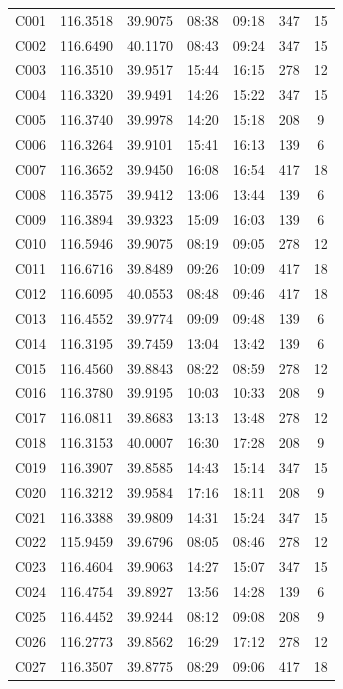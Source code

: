 \documentclass{setp-new}
\begin{document}
\begin{supertabular*}{\textwidth}{@{\extracolsep{\fill}}ccccccc@{}}
C001 & 116.3518 & 39.9075 & 08:38 & 09:18 & 347 & 15\\
C002 & 116.6490 & 40.1170 & 08:43 & 09:24 & 347 & 15\\
C003 & 116.3510 & 39.9517 & 15:44 & 16:15 & 278 & 12\\
C004 & 116.3320 & 39.9491 & 14:26 & 15:22 & 347 & 15\\
C005 & 116.3740 & 39.9978 & 14:20 & 15:18 & 208 & 9\\
C006 & 116.3264 & 39.9101 & 15:41 & 16:13 & 139 & 6\\
C007 & 116.3652 & 39.9450 & 16:08 & 16:54 & 417 & 18\\
C008 & 116.3575 & 39.9412 & 13:06 & 13:44 & 139 & 6\\
C009 & 116.3894 & 39.9323 & 15:09 & 16:03 & 139 & 6\\
C010 & 116.5946 & 39.9075 & 08:19 & 09:05 & 278 & 12\\
C011 & 116.6716 & 39.8489 & 09:26 & 10:09 & 417 & 18\\
C012 & 116.6095 & 40.0553 & 08:48 & 09:46 & 417 & 18\\
C013 & 116.4552 & 39.9774 & 09:09 & 09:48 & 139 & 6\\
C014 & 116.3195 & 39.7459 & 13:04 & 13:42 & 139 & 6\\
C015 & 116.4560 & 39.8843 & 08:22 & 08:59 & 278 & 12\\
C016 & 116.3780 & 39.9195 & 10:03 & 10:33 & 208 & 9\\
C017 & 116.0811 & 39.8683 & 13:13 & 13:48 & 278 & 12\\
C018 & 116.3153 & 40.0007 & 16:30 & 17:28 & 208 & 9\\
C019 & 116.3907 & 39.8585 & 14:43 & 15:14 & 347 & 15\\
C020 & 116.3212 & 39.9584 & 17:16 & 18:11 & 208 & 9\\
C021 & 116.3388 & 39.9809 & 14:31 & 15:24 & 347 & 15\\
C022 & 115.9459 & 39.6796 & 08:05 & 08:46 & 278 & 12\\
C023 & 116.4604 & 39.9063 & 14:27 & 15:07 & 347 & 15\\
C024 & 116.4754 & 39.8927 & 13:56 & 14:28 & 139 & 6\\
C025 & 116.4452 & 39.9244 & 08:12 & 09:08 & 208 & 9\\
C026 & 116.2773 & 39.8562 & 16:29 & 17:12 & 278 & 12\\
C027 & 116.3507 & 39.8775 & 08:29 & 09:06 & 417 & 18\\

\end{supertabular*}
\end{document}
